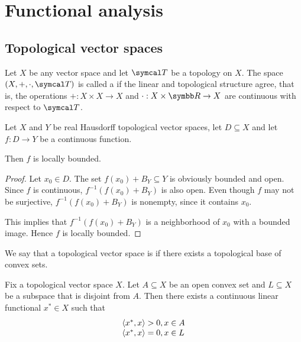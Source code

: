 \section{Functional analysis}\label{sec:functional_analysis}
\subsection{Topological vector spaces}\label{subsec:topological_vector_spaces}

\begin{definition}\label{def:topological_vector_space}
  Let \( X \) be any vector space and let \( \Cal{T} \) be a topology on \( X \). The space \( (X, +, \cdot, \Cal{T}) \) is called a  if the linear and topological structure agree, that is, the operations \( +: X \times X \to X \) and \( \cdot: X \times \R \to X \) are continuous with respect to \( \Cal{T} \).
\end{definition}

\begin{proposition}\label{thm:continuous_implies_locally_bounded}
  Let \( X \) and \( Y \) be real Hausdorff topological vector spaces, let \( D \subseteq X \) and let \( f: D \to Y \) be a continuous function.

  Then \( f \) is locally bounded.
\end{proposition}
\begin{proof}
  Let \( x_0 \in D \). The set \( f(x_0) + B_Y \subseteq Y \) is obviously bounded and open. Since \( f \) is continuous, \( f^{-1}(f(x_0) + B_Y) \) is also open. Even though \( f \) may not be surjective, \( f^{-1}(f(x_0) + B_Y) \) is nonempty, since it contains \( x_0 \).

  This implies that \( f^{-1}(f(x_0) + B_Y) \) is a neighborhood of \( x_0 \) with a bounded image. Hence \( f \) is locally bounded.
\end{proof}

\begin{definition}\label{def:locally_convex_space}\cite[1.8]{Rudin1991}
  We say that a topological vector space is  if there exists a topological base of convex sets.
\end{definition}

\begin{theorem}\label{thm:hahn_banach}\cite[24]{Йоффе1974}
  Fix a topological vector space \( X \). Let \( A \subseteq X \) be an open convex set and \( L \subseteq X \) be a subspace that is disjoint from \( A \). Then there exists a continuous linear functional \( x^* \in X \) such that
  \begin{equation*}
    \begin{array}{l}
      \left\langle x^*, x \right\rangle > 0, x \in A \\
      \left\langle x^*, x \right\rangle = 0, x \in L
    \end{array}
  \end{equation*}
\end{theorem}

